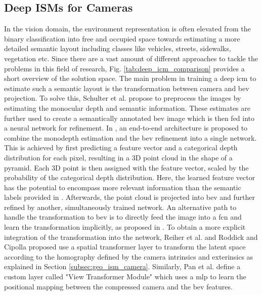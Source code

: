 \subsection{Deep ISMs for Cameras}
\label{subsec:deep_ism_camera}
In the vision domain, the environment representation is often elevated from the binary classification into free and occupied space towards estimating a more detailed semantic layout including classes like vehicles, streets, sidewalks, vegetation etc. Since there are a vast amount of different approaches to tackle the problems in this field of research, Fig. \ref{tab:deep_icm_comparison} provides a short overview of the solution space.
The main problem in training a deep \gls{icm} to estimate such a semantic layout is the transformation between camera and \gls{bev} projection. To solve this, Schulter et al. \cite{schulter2018learning} propose to preprocess the images by estimating the monocular depth and semantic information. These estimates are further used to create a semantically annotated \gls{bev} image which is then fed into a neural network for refinement. In \cite{philion2020lift}, an end-to-end architecture is proposed to combine the \gls{monodepth} estimation and the \gls{bev} refinement into a single network. This is achieved by first predicting a feature vector and a categorical depth distribution for each pixel, resulting in a 3D point cloud in the shape of a pyramid. Each 3D point is then assigned with the feature vector, scaled by the probability of the categorical depth distribution. Here, the learned feature vector has the potential to encompass more relevant information than the semantic labels provided in \cite{schulter2018learning}. Afterwards, the point cloud is projected into \gls{bev} and further refined by another, simultaneously trained network. An alternative path to handle the transformation to \gls{bev} is to directly feed the image into a \gls{fcn} and learn the transformation implicitly, as proposed in \cite{mani2020monolayout,lu2019monocular}. To obtain a more explicit integration of the transformation into the network, Reiher et al. \cite{reiher2020sim2real} and Roddick and Cipolla \cite{roddick2020predicting} proposed use a spatial transformer layer \cite{jaderberg2015spatial} to transform the latent space according to the homography defined by the camera intrinsics and exterinsics as explained in Section \ref{subsec:geo_ism_camera}. Similarly, Pan et al. \cite{pan2020cross} define a custom layer called "View Transformer Module" which uses a \gls{mlp} to learn the positional mapping between the compressed camera and the \gls{bev} features.
